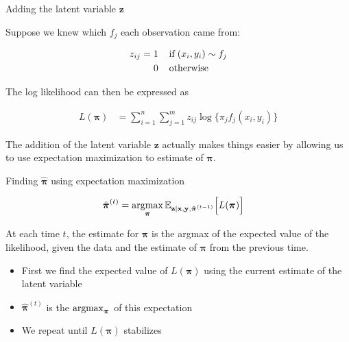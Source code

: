 \documentclass{beamer}
\newcommand{\eqn}[1]{\begin{align*}
#1
\end{align*}}
\newcommand{\vect}[1]{\boldsymbol{\mathbf{#1}}}
\newcommand{\bl}{\big\{}
\newcommand{\br}{\big\}}
\newcommand{\argmax}{\operatornamewithlimits{argmax}}
\newcommand{\vx}{\vect{x}}
\newcommand{\vy}{\vect{y}}
\newcommand{\vp}{\vect{\pi}}
\newcommand{\vph}{\hat{\vect{\pi}}}
\newcommand{\sumn}{\sum^n_{i=1}}
\newcommand{\summ}{\sum^m_{j=1}}
\newcommand{\fab}{f_j}
\newcommand{\llp}{L(\vp)}
\begin{document}
\begin{frame}{Adding the latent variable $\vect{z}$}
	
	Suppose we knew which $f_j$ each observation came from:
	
	\eqn{
		z_{ij} 	= \hspace{1mm} & 1  \hspace{4mm} \text{if} \hspace{1mm} (x_i,y_i) \sim f_j	\\
				& 0 \hspace{4mm} \text{otherwise}
	}
	
	
	The log likelihood can then be expressed as
	
	\eqn{
		L(\vect{\pi}) &= \sumn \summ z_{ij}  \log \bl \pi_j  \fab(x_i,y_i) \br
	}
	
	The addition of the latent variable $\vect{z}$ actually makes things easier by allowing us to use expectation maximization to estimate of $\vp$. 
	
	
\end{frame}










\begin{frame}{Finding $\vph$ using expectation maximization}
	
	\eqn{
		\vph^{(t)} &= \argmax_{\vp} \mathbb{E}_{\vect{z}| \vx,\vy,\vph^{(t-1)} }\Big[\llp \Big]   
	}
	
	At each time $t$, the estimate for $\vp$ is the argmax of the expected value of the likelihood, given the data and the estimate of $\vp$ from the previous time.
	
	\begin{itemize}
		\item First we find the expected value of $\llp$ using the current estimate of the latent variable
		\item $\vph^{(t)}$ is the $\argmax_{\vp}$ of this expectation
		\item We repeat until $\llp$ stabilizes
	\end{itemize}
	
	
	
	
\end{frame}
\end{document}
